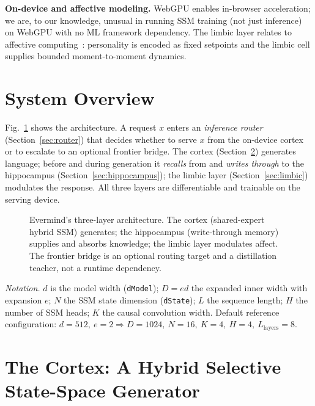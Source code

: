 \documentclass[journal,onecolumn,11pt]{IEEEtran}
\begin{document}
\textbf{On-device and affective modeling.} WebGPU enables in-browser
acceleration; we are, to our knowledge, unusual in running SSM training (not just
inference) on WebGPU with no ML framework dependency. The limbic layer relates to
affective computing~\cite{picard1997affective}: personality is encoded as fixed
setpoints and the limbic cell supplies bounded moment-to-moment dynamics.

\section{System Overview}
\label{sec:overview}
Fig.~\ref{fig:arch} shows the architecture. A request $x$ enters an
\emph{inference router} (Section~\ref{sec:router}) that decides whether to serve
$x$ from the on-device cortex or to escalate to an optional frontier bridge. The
cortex (Section~\ref{sec:cortex}) generates language; before and during
generation it \emph{recalls} from and \emph{writes through} to the hippocampus
(Section~\ref{sec:hippocampus}); the limbic layer (Section~\ref{sec:limbic})
modulates the response. All three layers are differentiable and trainable on the
serving device.

\begin{figure}[t]
\centering

\caption{Evermind's three-layer architecture. The cortex (shared-expert hybrid
SSM) generates; the hippocampus (write-through memory) supplies and absorbs
knowledge; the limbic layer modulates affect. The frontier bridge is an optional
routing target and a distillation teacher, not a runtime dependency.}
\label{fig:arch}
\end{figure}

\textit{Notation.} $d$ is the model width (\texttt{dModel}); $D=ed$ the expanded
inner width with expansion $e$; $N$ the SSM state dimension (\texttt{dState});
$L$ the sequence length; $H$ the number of SSM heads; $K$ the causal convolution
width. Default reference configuration:
$d{=}512,\ e{=}2\Rightarrow D{=}1024,\ N{=}16,\ K{=}4,\ H{=}4,\ L_{\text{layers}}{=}8$.

\section{The Cortex: A Hybrid Selective State-Space Generator}
\label{sec:cortex}
\end{document}
